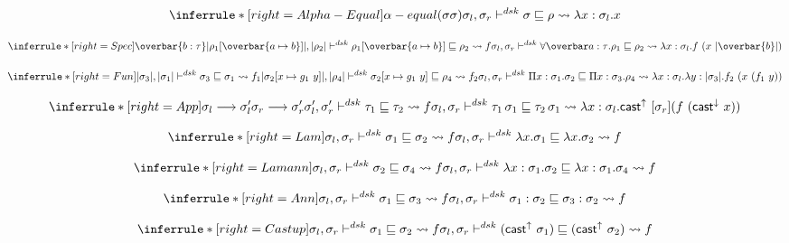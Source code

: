 \[
\inferrule*[right=Alpha-Equal]
{  \alpha-equal(\sigma \sigma)  }
{  \sigmal, \sigmar \dsk \sigma \sqsubseteq \rho \transto{\lambda x: \sigmal. x}}
\]

\[
\inferrule*[right=Spec]
{\overbar{b: \tau} \\
\translated{\rho_1[\overbar{\tpmapsto \tau a b}]}, \translated{\rho_2} \dsk \rho_1[\overbar{\tpmapsto \tau a b}] \sqsubseteq \rho_2 \transto{f} \\
}
{\sigmal, \sigmar \dsk \forallvars{a:\tau}.\rho_1 \sqsubseteq \rho_2 \\
\transto {\lambda x:\sigmal. f\ (x\ \translated{\overbar{b}}) }}
\]

\[
\inferrule*[right=Fun]
{\translated{\sigma_3}, \translated{\sigma_1}\dsk  \sigma_3 \sqsubseteq \sigma_1 \transto{f_1} \\
\translated{\sigma_2[x \mapsto g_1\ y]}, \translated{\rho_4}\dsk  \sigma_2[x \mapsto g_1\ y] \sqsubseteq \rho_4 \transto{f_2} \\
 }
{\sigmal, \sigmar \dsk \Pi x:\sigma_1. \sigma_2 \sqsubseteq \Pi x:\sigma_3. \rho_4 \\
\transto {\lambda x:\sigmal. \lambda y:\translated{\sigma_3} . f_2\ (x\ (f_1\ y))}
}
\]

\[
\inferrule*[right=App]
{\sigmal \longrightarrow \sigmal' \\
\sigmar \longrightarrow \sigmar' \\
\sigmal', \sigmar' \dsk \tau_1 \sqsubseteq \tau_2 \transto {f}\\
}
{\sigmal, \sigmar \dsk \tau_1\, \sigma_1 \sqsubseteq \tau_2\, \sigma_1 \\
\transto {\lambda x:\sigmal. \castupe [\sigmar] (f\ (\castdowne x))}}
\]

\[
\inferrule*[right=Lam]
{
\sigmal, \sigmar \dsk \sigma_1 \sqsubseteq \sigma_2 \transto {f}}
{ \sigmal, \sigmar \dsk \lambda x. \sigma_1 \sqsubseteq \lambda x. \sigma_2 \transto {f}}
\]


\[
\inferrule*[right=Lamann]
{
\sigmal, \sigmar \dsk \sigma_2 \sqsubseteq \sigma_4 \transto{f}}
{\sigmal, \sigmar \dsk \lambda x:\sigma_1. \sigma_2 \sqsubseteq \lambda x:\sigma_1. \sigma_4 \\
\transto {f}}
\]


\[
\inferrule*[right=Ann]
{
\sigmal, \sigmar \dsk  \sigma_1 \sqsubseteq \sigma_3 \transto{f}}
{\sigmal, \sigmar \dsk \sigma_1:\sigma_2 \sqsubseteq \sigma_3:\sigma_2 \transto {f}}
\]

\[
\inferrule*[right=Castup]
{
\sigmal, \sigmar \dsk  \sigma_1 \sqsubseteq \sigma_2 \transto {f}}
{\sigmal, \sigmar \dsk  (\castupe \sigma_1) \sqsubseteq  (\castupe \sigma_2) \transto {f}}
\]


